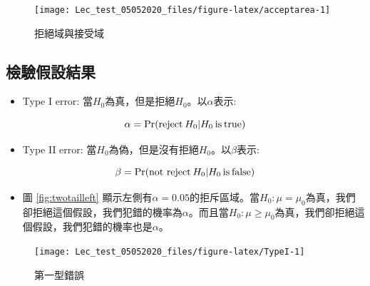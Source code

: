 \documentclass[hyperref,]{ctexart}
\providecommand{\tightlist}{%
  \setlength{\itemsep}{0pt}\setlength{\parskip}{0pt}}
\begin{document}
\begin{figure}

\texttt{[image: Lec\_test\_05052020\_files/figure-latex/acceptarea-1]} \hfill{}

\caption{\label{fig:accept}拒絕域與接受域}\label{fig:acceptarea}
\end{figure}

\hypertarget{ux6aa2ux9a57ux5047ux8a2dux7d50ux679c}{%
\subsection{檢驗假設結果}\label{ux6aa2ux9a57ux5047ux8a2dux7d50ux679c}}

\begin{itemize}
\tightlist
\item
  Type I error:
  當\(H_{\text{0}}\)為真，但是拒絕\(H_{\text{0}}\)。以\(\alpha\)表示:
\end{itemize}

\[\alpha=\text{Pr}(\text{reject}\hspace{.2em}H_{\text{0}}|H_{\text{0}}\hspace{.2em} \text{is}\hspace{.2em} \text{true})\]

\begin{itemize}
\tightlist
\item
  Type II error:
  當\(H_{\text{0}}\)為偽，但是沒有拒絕\(H_{\text{0}}\)。以\(\beta\)表示:
\end{itemize}

\[\beta=\text{Pr}(\text{not reject}\hspace{.2em}H_{\text{0}}|H_{\text{0}}\hspace{.2em} \text{is}\hspace{.2em} \text{false})\]

\begin{itemize}
\tightlist
\item
  圖 \ref{fig:twotailleft}
  顯示左側有\(\alpha=0.05\)的拒斥區域。當\(H_{\text{0}}: \mu=\mu_{0}\)為真，我們卻拒絕這個假設，我們犯錯的機率為\(\alpha\)。而且當\(H_{\text{0}}: \mu\geq \mu_{0}\)為真，我們卻拒絕這個假設，我們犯錯的機率也是\(\alpha\)。
\end{itemize}

\begin{figure}

\texttt{[image: Lec\_test\_05052020\_files/figure-latex/TypeI-1]} \hfill{}

\caption{\label{fig:twotailleft}第一型錯誤}\label{fig:TypeI}
\end{figure}
\end{document}

